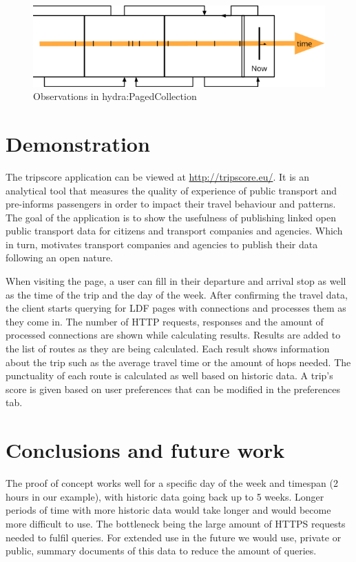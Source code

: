 \documentclass[runningheads,a4paper]{llncs}
\makeatletter
\def\maxwidth#1{\ifdim\Gin@nat@width>#1 #1\else\Gin@nat@width\fi}
\makeatother
\begin{document}
\begin{figure}[h!]
\centering
\includegraphics[width=\maxwidth{\textwidth}]{./img/image3.png}
\cprotect\caption{Observations  in  hydra:PagedCollection}
\label{}
\end{figure}


\section{Demonstration}

The tripscore application can be viewed at \url{http://tripscore.eu/}. It is an analytical tool that measures the quality of experience of public transport and pre-informs passengers in order to impact their travel behaviour and patterns. The goal of the application is to show the usefulness of publishing linked open public transport data for citizens and transport companies and agencies. Which in turn, motivates transport companies and agencies to publish their data following an open nature.

When visiting the page, a user can fill in their departure and arrival stop as well as the time of the trip and the day of the week. After confirming the travel data, the client starts querying for LDF pages with connections and processes them as they come in. The number of HTTP requests, responses and the amount of processed connections are shown while calculating results. Results are added to the list of routes as they are being calculated. Each result shows information about the trip such as the average travel time or the amount of hops needed. The punctuality of each route is calculated as well based on historic data. A trip's score is given based on user preferences that can be modified in the preferences tab.

\section{Conclusions and future work}

The proof of concept works well for a specific day of the week and timespan (2 hours in our example), with historic data going back up to 5 weeks. Longer periods of time with more historic data would take longer and would become more difficult to use. The bottleneck being the large amount of HTTPS requests needed to fulfil queries. For extended use in the future we would use, private or public, summary documents of this data to reduce the amount of queries. 
\end{document}
